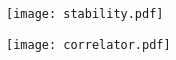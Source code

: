 \documentclass[10pt]{article}
\begin{document}
\begin{center}
    
\end{center}

    \texttt{[image: stability.pdf]}

    \texttt{[image: correlator.pdf]}
\end{document}
